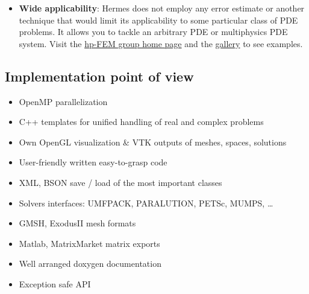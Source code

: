 \documentclass[a4paper,0pt,english]{sphinxmanual}
\let\origfigure=\figure
\renewenvironment{figure}[6]{
\origfigure[H]}
{\endlist}
\begin{document}
\begin{figure}[htbp]
\centering

\end{figure}
\begin{itemize}
\item {} 
\textbf{Wide applicability}: Hermes does not employ any error estimate or another technique that would limit its applicability to some particular class of PDE problems. It allows you to tackle an arbitrary PDE or multiphysics PDE system. Visit the \href{http://hpfem.org/}{hp-FEM group home page} and the \href{http://hpfem.org/gallery/}{gallery} to see examples.

\end{itemize}
\begin{figure}[htbp]
\centering

\end{figure}


\subsection{Implementation point of view}
\label{src/math-background:implementation-point-of-view}\begin{itemize}
\item {} 
OpenMP parallelization

\item {} 
C++ templates for unified handling of real and complex problems

\item {} 
Own OpenGL visualization \& VTK outputs of meshes, spaces, solutions

\item {} 
User-friendly written easy-to-grasp code

\item {} 
XML, BSON save / load of the most important classes

\item {} 
Solvers interfaces: UMFPACK, PARALUTION, PETSc, MUMPS, …

\item {} 
GMSH, ExodusII mesh formats

\item {} 
Matlab, MatrixMarket matrix exports

\item {} 
Well arranged doxygen documentation

\item {} 
Exception safe API

\end{itemize}
\end{document}
